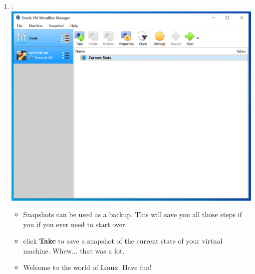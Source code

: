\documentclass[12pt]{article}
\begin{document}
\begin{description}
\begin{description}
\begin{enumerate}[label=\alph*)]
    		\item : \vspace{5mm} \\
      		\includegraphics[scale=.50]{Capture27.png}
      		 \begin{itemize}
      		\item Snapshots can be used as a backup. This will save you all those steps if you if you ever need to start over.  
         
     		\item click {\bf Take} to save a snapshot of the current state of your virtual machine. Whew... that was a lot. 
     		\item Welcome to the world of Linux. Have fun!
    		\end{itemize}
\end{enumerate}

\end{description}    
\end{description}
\end{document}
